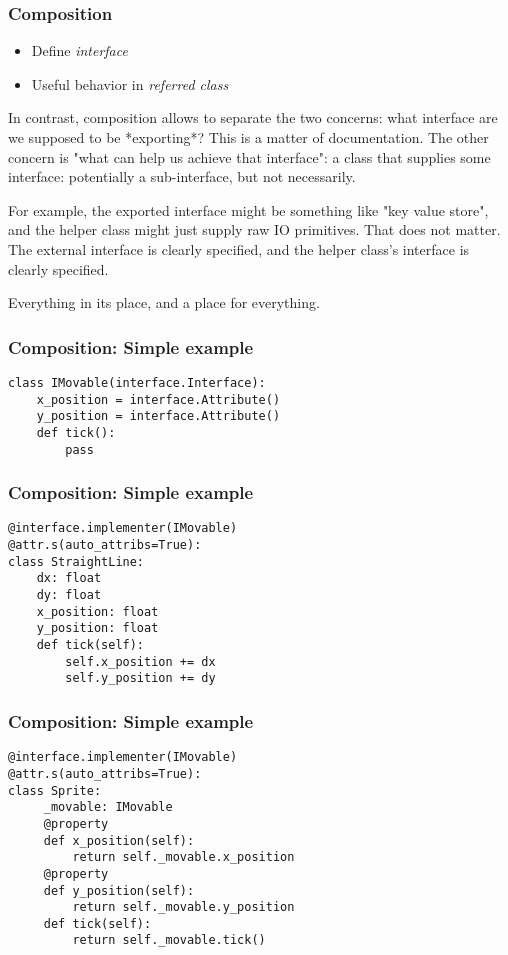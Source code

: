 \documentclass[ignorenonframetext,aspectration=169]{beamer}
\begin{document}
\begin{frame}[fragile]
\frametitle{Composition}

\begin{itemize}
\item Define {\em interface}
\item Useful behavior in {\em referred class}
\end{itemize}

\end{frame}

In contrast,
composition allows to separate the two concerns:
what interface are we supposed to be *exporting*?
This is a matter of documentation.
The other concern is
"what can help us achieve that interface":
a class that supplies some interface:
potentially a sub-interface,
but not necessarily.

For example,
the exported interface might be something like
"key value store",
and the helper class might just supply raw IO primitives.
That does not matter.
The external interface is clearly specified,
and the helper class's interface is clearly specified.

Everything in its place,
and a place for everything.

\begin{frame}[fragile]
\frametitle{Composition: Simple example}
\begin{lstlisting}
class IMovable(interface.Interface):
    x_position = interface.Attribute()
    y_position = interface.Attribute()
    def tick():
        pass
\end{lstlisting}

\end{frame}

\begin{frame}[fragile]
\frametitle{Composition: Simple example}
\begin{lstlisting}
@interface.implementer(IMovable)
@attr.s(auto_attribs=True):
class StraightLine:
    dx: float
    dy: float
    x_position: float
    y_position: float
    def tick(self):
        self.x_position += dx
        self.y_position += dy
\end{lstlisting}

\end{frame}

\begin{frame}[fragile]
\frametitle{Composition: Simple example}
\begin{lstlisting}
@interface.implementer(IMovable)
@attr.s(auto_attribs=True):
class Sprite:
     _movable: IMovable
     @property
     def x_position(self):
         return self._movable.x_position
     @property
     def y_position(self):
         return self._movable.y_position
     def tick(self):
         return self._movable.tick()
\end{lstlisting}

\end{frame}
\end{document}
